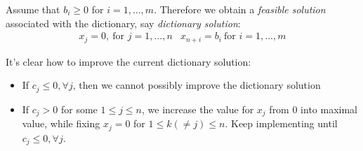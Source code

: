 Assume that $b_i\ge0$ for $i=1,\dots,m$. Therefore we obtain a \emph{feasible solution} associated with the dictionary, say \emph{dictionary solution}:
\[
\begin{array}{ll}
x_j=0,\ \text{for $j=1,\dots,n$}
&
x_{n+i}=b_i \ \text{for $i=1,\dots,m$}
\end{array}
\]

It's clear how to improve the current dictionary solution:
\begin{itemize}
\item
If $c_j\le0,\forall j$, then we cannot possibly improve the dictionary solution
\item
If $c_j>0$ for some $1\le j\le n$, we increase the value for $x_j$ from $0$ into maximal value, while fixing $x_j=0$ for $1\le k(\ne j)\le n$. Keep implementing until $c_j\le0,\forall j$.
\end{itemize}

